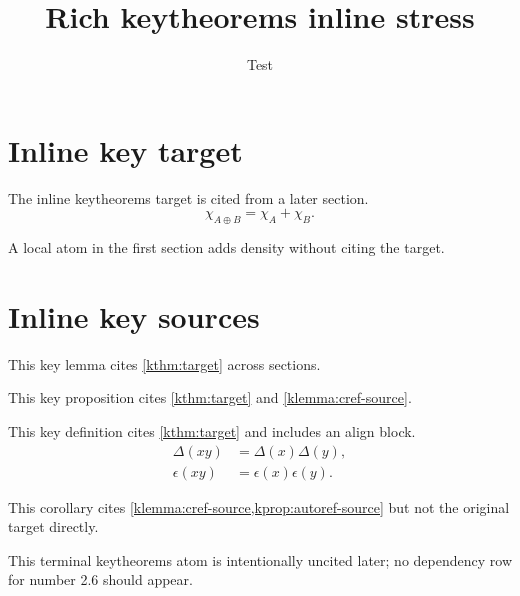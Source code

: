 \documentclass{article}
\title{Rich keytheorems inline stress}
\author{Test}
\date{}
\begin{document}
\START
\maketitle

\section{Inline key target}
\label{sec:key-inline-target}

\begin{kthm}\label{kthm:target}
The inline keytheorems target is cited from a later section.
\begin{equation}\label{eq:key-inline-target}
  \chi_{A\oplus B}=\chi_A+\chi_B.
\end{equation}
\end{kthm}

\begin{kfree}\label{kfree:local}
A local atom in the first section adds density without citing the target.
\end{kfree}

\section{Inline key sources}
\label{sec:key-inline-sources}

\begin{klemma}\label{klemma:cref-source}
This key lemma cites \cref{kthm:target} across sections.
\end{klemma}

\begin{kprop}\label{kprop:autoref-source}
This key proposition cites \autoref{kthm:target} and \cref{klemma:cref-source}.
\end{kprop}

\begin{kdefn}\label{kdefn:def-source}
This key definition cites \cref{kthm:target} and includes an align block.
\begin{align}
  \Delta(xy) &= \Delta(x)\Delta(y),\\
  \epsilon(xy) &= \epsilon(x)\epsilon(y).
\end{align}
\end{kdefn}

\begin{kcor}\label{kcor:cor-source}
This corollary cites \cref{klemma:cref-source,kprop:autoref-source} but not the original target directly.
\end{kcor}

\begin{kfree}\label{kfree:quiet}
This terminal keytheorems atom is intentionally uncited later; no dependency row for number 2.6 should appear.
\end{kfree}

\END
\end{document}
